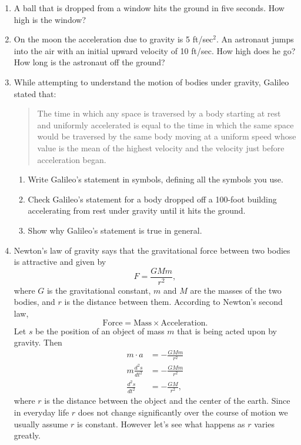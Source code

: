 \documentclass[11pt]{article}
\begin{document}
\drawtitle

\begin{enumerate}
\item A ball that is dropped from a window hits the ground in five
  seconds. How high is the window?

  \vfill
  
\item On the moon the acceleration due to gravity is 5 ft/sec$^2$.  An
  astronaut jumps into the air with an initial upward velocity of 10
  ft/sec.  How high does he go? How long is the astronaut off the
  ground?

  \vfill\newpage

\item While attempting to understand the motion of bodies under
  gravity, Galileo stated that:

  \begin{quote}
    The time in which any space is traversed by a body starting at
    rest and uniformly accelerated is equal to the time in which the
    same space would be traversed by the same body moving at a uniform
    speed whose value is the mean of the highest velocity and the
    velocity just before acceleration began.
  \end{quote}

  \begin{enumerate}
  \item Write Galileo's statement in symbols, defining all the symbols
    you use.

    \vfill
    
  \item Check Galileo's statement for a body dropped off a 100-foot
    building accelerating from rest under gravity until it hits the
    ground.

    \vfill
    
  \item Show why Galileo's statement is true in general.

    \vfill
    
  \end{enumerate}

  \newpage

\item Newton's law of gravity says that the gravitational force
  between two bodies is attractive and given by
  \[
  F=\frac{GMm}{r^2},
  \]
  where $G$ is the gravitational constant, $m$ and $M$ are the masses
  of the two bodies, and $r$ is the distance between them.  According
  to Newton's second law,
  \[
  \text{Force}=\text{Mass}\times\text{Acceleration}.
  \]
  Let $s$ be the position of an object of mass $m$ that is being acted
  upon by gravity.  Then
  \begin{align*}
    m\cdot a &= -\frac{GMm}{r^2} \\
    m\frac{d^2s}{dt^2} &= -\frac{GMm}{r^2} \\
    \frac{d^2s}{dt^2} &= -\frac{GM}{r^2},
  \end{align*}
  where $r$ is the distance between the object and the center of the
  earth.  Since in everyday life $r$ does not change significantly
  over the course of motion we usually assume $r$ is constant.
  However let's see what happens as $r$ varies greatly.


\end{enumerate}
\end{document}
